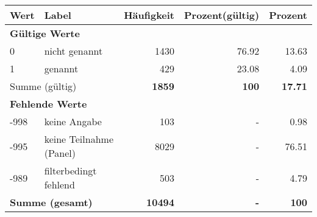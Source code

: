      \begin{longtable}{lXrrr}
     \toprule
     \textbf{Wert} & \textbf{Label} & \textbf{Häufigkeit} & \textbf{Prozent(gültig)} & \textbf{Prozent} \\
     \endhead
     \midrule
     \multicolumn{5}{l}{\textbf{Gültige Werte}}\\

     0 &
     \multicolumn{1}{X}{ nicht genannt   } &


       \num{1430} &
       \num[round-mode=places,round-precision=2]{76,92} &
         \num[round-mode=places,round-precision=2]{13,63} \\

     1 &
     \multicolumn{1}{X}{ genannt   } &


       \num{429} &
       \num[round-mode=places,round-precision=2]{23,08} &
         \num[round-mode=places,round-precision=2]{4,09} \\
     \midrule
     \multicolumn{2}{l}{Summe (gültig)} &
       \textbf{\num{1859}} &
     \textbf{100} &
       \textbf{\num[round-mode=places,round-precision=2]{17,71}} \\
     \multicolumn{5}{l}{\textbf{Fehlende Werte}}\\
       -998 &
       keine Angabe &
         \num{103} &
        - &
         \num[round-mode=places,round-precision=2]{0,98} \\
       -995 &
       keine Teilnahme (Panel) &
         \num{8029} &
        - &
         \num[round-mode=places,round-precision=2]{76,51} \\
       -989 &
       filterbedingt fehlend &
         \num{503} &
        - &
         \num[round-mode=places,round-precision=2]{4,79} \\
     \midrule
     \multicolumn{2}{l}{\textbf{Summe (gesamt)}} &
          \textbf{\num{10494}} &
        \textbf{-} &
        \textbf{100} \\
     \bottomrule
     \end{longtable}
     
